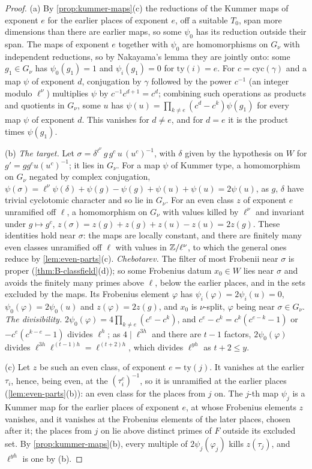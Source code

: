 \begin{proof}
(a) By \cref{prop:kummer-maps}(c) the reductions of the Kummer maps of exponent $e$ for the earlier places of exponent $e$, off a suitable $T_0$, span more dimensions than there are earlier maps, so some $\psi_0$ has its reduction outside
their span. The maps of exponent $e$ together with $\psi_0$ are homomorphisms on $G_\nu$ with independent reductions, so by Nakayama's lemma they are jointly onto: some $g_1\in G_\nu$ has $\psi_0(g_1)=1$ and $\psi_i(g_1)=0$ for $\mathrm{ty}(i)=e$. For
$c=\mathrm{cyc}(\gamma)$ and a map $\psi$ of exponent $d$, conjugation by $\gamma$ followed by the power $c^{-1}$ (an integer modulo $\ell^\nu$) multiplies $\psi$ by $c^{-1}c^{d+1}=c^d$; combining such operations as products and quotients in $G_\nu$, some $u$
has $\psi(u)=\prod_{k\ne e}(c^d-c^k)\psi(g_1)$ for every map $\psi$ of exponent $d$. This vanishes for $d\ne e$, and for $d=e$ it is the product times $\psi(g_1)$.

(b) \emph{The target.} Let $\sigma=\delta^{\ell^\nu}\,g\,g^c\,u\,(u^c)^{-1}$, with $\delta$ given by the hypothesis on $W$ for $g'=gg^cu(u^c)^{-1}$; it lies in $G_\nu$. For a map $\psi$ of Kummer type, a homomorphism on $G_\nu$ negated by complex conjugation,
$\psi(\sigma)=\ell^\nu\psi(\delta)+\psi(g)-\psi(g)+\psi(u)+\psi(u)=2\psi(u)$, as $g$, $\delta$ have trivial cyclotomic character and so lie in $G_\nu$. For an even class $z$ of exponent $e$ unramified off $\ell$, a homomorphism on $G_\nu$ with values killed by $\ell^\nu$
and invariant under $g\mapsto g^c$, $z(\sigma)=z(g)+z(g)+z(u)-z(u)=2z(g)$. These identities hold near $\sigma$: the maps are locally constant, and there are finitely many even classes unramified off $\ell$ with values in $\mathbb{Z}/\ell^\nu$, to
which the general ones reduce by \cref{lem:even-parts}(c). \emph{Chebotarev.} The filter of most Frobenii near $\sigma$ is proper (\cref{thm:B-classfield}(d)); so some Frobenius datum $x_0\in W$ lies near $\sigma$ and avoids the finitely many
primes above $\ell$, below the earlier places, and in the sets excluded by the maps. Its Frobenius element $\varphi$ has $\psi_i(\varphi)=2\psi_i(u)=0$, $\psi_0(\varphi)=2\psi_0(u)$ and $z(\varphi)=2z(g)$, and $x_0$ is $\nu$-split, $\varphi$ being near $\sigma\in G_\nu$. \emph{The divisibility.}
$2\psi_0(\varphi)=4\prod_{k\ne e}(c^e-c^k)$, and $c^e-c^k=c^k(c^{e-k}-1)$ or $-c^e(c^{k-e}-1)$ divides $\ell^h$; as $4\mid\ell^{3h}$ and there are $t-1$ factors, $2\psi_0(\varphi)$ divides $\ell^{3h}\ell^{(t-1)h}=\ell^{(t+2)h}$, which divides $\ell^{yh}$ as $t+2\le y$.

(c) Let $z$ be such an even class, of exponent $e=\mathrm{ty}(j)$. It vanishes at the earlier $\tau_i$, hence, being even, at the $(\tau_i^c)^{-1}$, so it is unramified at the earlier places (\cref{lem:even-parts}(b)): an even class for the places from $j$
on. The $j$-th map $\psi_j$ is a Kummer map for the earlier places of exponent $e$, at whose Frobenius elements $z$ vanishes, and it vanishes at the Frobenius elements of the later places, chosen after it; the places from $j$ on lie
above distinct primes of $F$ outside its excluded set. By \cref{prop:kummer-maps}(b), every multiple of $2\psi_j(\varphi_j)$ kills $z(\tau_j)$, and $\ell^{yh}$ is one by (b).
\end{proof}

